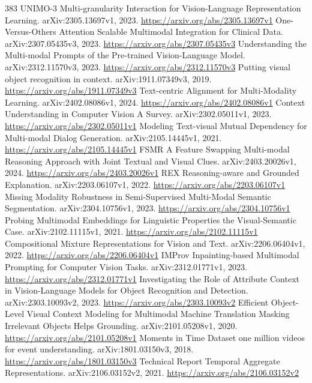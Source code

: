 \documentclass[11pt]{article}
\begin{document}
\begin{thebibliography}{383}
 UNIMO-3 Multi-granularity Interaction for Vision-Language Representation Learning. arXiv:2305.13697v1, 2023. \url{https://arxiv.org/abs/2305.13697v1}
 One-Versus-Others Attention Scalable Multimodal Integration for Clinical Data. arXiv:2307.05435v3, 2023. \url{https://arxiv.org/abs/2307.05435v3}
 Understanding the Multi-modal Prompts of the Pre-trained Vision-Language Model. arXiv:2312.11570v3, 2023. \url{https://arxiv.org/abs/2312.11570v3}
 Putting visual object recognition in context. arXiv:1911.07349v3, 2019. \url{https://arxiv.org/abs/1911.07349v3}
 Text-centric Alignment for Multi-Modality Learning. arXiv:2402.08086v1, 2024. \url{https://arxiv.org/abs/2402.08086v1}
 Context Understanding in Computer Vision A Survey. arXiv:2302.05011v1, 2023. \url{https://arxiv.org/abs/2302.05011v1}
 Modeling Text-visual Mutual Dependency for Multi-modal Dialog Generation. arXiv:2105.14445v1, 2021. \url{https://arxiv.org/abs/2105.14445v1}
 FSMR A Feature Swapping Multi-modal Reasoning Approach with Joint Textual and Visual Clues. arXiv:2403.20026v1, 2024. \url{https://arxiv.org/abs/2403.20026v1}
 REX Reasoning-aware and Grounded Explanation. arXiv:2203.06107v1, 2022. \url{https://arxiv.org/abs/2203.06107v1}
 Missing Modality Robustness in Semi-Supervised Multi-Modal Semantic Segmentation. arXiv:2304.10756v1, 2023. \url{https://arxiv.org/abs/2304.10756v1}
 Probing Multimodal Embeddings for Linguistic Properties the Visual-Semantic Case. arXiv:2102.11115v1, 2021. \url{https://arxiv.org/abs/2102.11115v1}
 Compositional Mixture Representations for Vision and Text. arXiv:2206.06404v1, 2022. \url{https://arxiv.org/abs/2206.06404v1}
 IMProv Inpainting-based Multimodal Prompting for Computer Vision Tasks. arXiv:2312.01771v1, 2023. \url{https://arxiv.org/abs/2312.01771v1}
 Investigating the Role of Attribute Context in Vision-Language Models for Object Recognition and Detection. arXiv:2303.10093v2, 2023. \url{https://arxiv.org/abs/2303.10093v2}
 Efficient Object-Level Visual Context Modeling for Multimodal Machine Translation Masking Irrelevant Objects Helps Grounding. arXiv:2101.05208v1, 2020. \url{https://arxiv.org/abs/2101.05208v1}
 Moments in Time Dataset one million videos for event understanding. arXiv:1801.03150v3, 2018. \url{https://arxiv.org/abs/1801.03150v3}
 Technical Report Temporal Aggregate Representations. arXiv:2106.03152v2, 2021. \url{https://arxiv.org/abs/2106.03152v2}

\end{thebibliography}
\end{document}
